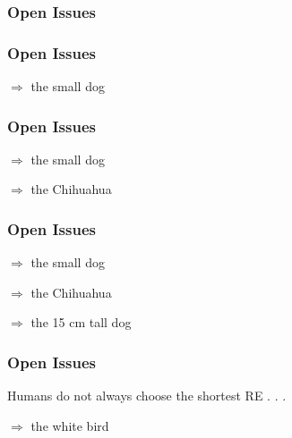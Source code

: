 \documentclass[compress,color=usenames]{beamer}
\begin{document}
\begin{frame}
\frametitle{
Open Issues}










\end{frame}
\begin{frame}
\frametitle{
Open Issues}






$\Rightarrow$ the small dog










\end{frame}
\begin{frame}
\frametitle{
Open Issues}






$\Rightarrow$ the small dog



$\Rightarrow$ the Chihuahua










\end{frame}
\begin{frame}
\frametitle{
Open Issues}






$\Rightarrow$ the small dog



$\Rightarrow$ the Chihuahua



$\Rightarrow$ the 15 cm tall dog










\end{frame}
\begin{frame}
\frametitle{
Open Issues}






Humans do not always choose the shortest RE . . .






$\Rightarrow$ the white bird










\end{frame}
\end{document}
